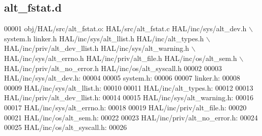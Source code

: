 \subsection{alt\+\_\+fstat.\+d}
\label{alt__fstat_8d_source}

\begin{DoxyCode}
00001 obj/HAL/src/alt\_fstat.o: HAL/src/alt\_fstat.c HAL/inc/sys/alt_dev.h \(\backslash\)
 system.h linker.h HAL/inc/sys/alt_llist.h HAL/inc/alt\_types.h \(\backslash\)
 HAL/inc/priv/alt_dev_llist.h HAL/inc/sys/alt\_warning.h \(\backslash\)
 HAL/inc/sys/alt_errno.h HAL/inc/priv/alt\_file.h HAL/inc/os/alt\_sem.h \(\backslash\)
 HAL/inc/priv/alt_no_error.h HAL/inc/os/alt\_syscall.h
00002 
00003 HAL/inc/sys/alt_dev.h:
00004 
00005 system.h:
00006 
00007 linker.h:
00008 
00009 HAL/inc/sys/alt_llist.h:
00010 
00011 HAL/inc/alt\_types.h:
00012 
00013 HAL/inc/priv/alt_dev_llist.h:
00014 
00015 HAL/inc/sys/alt\_warning.h:
00016 
00017 HAL/inc/sys/alt_errno.h:
00018 
00019 HAL/inc/priv/alt\_file.h:
00020 
00021 HAL/inc/os/alt\_sem.h:
00022 
00023 HAL/inc/priv/alt_no_error.h:
00024 
00025 HAL/inc/os/alt\_syscall.h:
00026 \end{DoxyCode}
